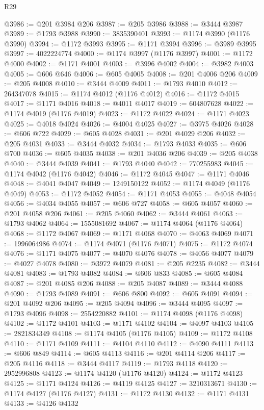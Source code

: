 \begin{lexlean}{R29}
\begin{coremodule}
@3986 := @201 @3984 @206
@3987 := @205 @3986
@3988 := @3444 @3987
@3989 := @1793 @3988
@3990 := 3835390401
@3993 := @1174 @3990 (@1176 @3990)
@3994 := @1172 @3993
@3995 := @1171 @3994
@3996 := @3989 @3995
@3997 := 4022224774
@4000 := @1174 @3997 (@1176 @3997)
@4001 := @1172 @4000
@4002 := @1171 @4001
@4003 := @3996 @4002
@4004 := @3982 @4003
@4005 := @606 @646
@4006 := @605 @4005
@4008 := @201 @4006 @206
@4009 := @205 @4008
@4010 := @3444 @4009
@4011 := @1793 @4010
@4012 := 264347078
@4015 := @1174 @4012 (@1176 @4012)
@4016 := @1172 @4015
@4017 := @1171 @4016
@4018 := @4011 @4017
@4019 := 604807628
@4022 := @1174 @4019 (@1176 @4019)
@4023 := @1172 @4022
@4024 := @1171 @4023
@4025 := @4018 @4024
@4026 := @4004 @4025
@4027 := @3975 @4026
@4028 := @606 @722
@4029 := @605 @4028
@4031 := @201 @4029 @206
@4032 := @205 @4031
@4033 := @3444 @4032
@4034 := @1793 @4033
@4035 := @606 @700
@4036 := @605 @4035
@4038 := @201 @4036 @206
@4039 := @205 @4038
@4040 := @3444 @4039
@4041 := @1793 @4040
@4042 := 770255983
@4045 := @1174 @4042 (@1176 @4042)
@4046 := @1172 @4045
@4047 := @1171 @4046
@4048 := @4041 @4047
@4049 := 1249150122
@4052 := @1174 @4049 (@1176 @4049)
@4053 := @1172 @4052
@4054 := @1171 @4053
@4055 := @4048 @4054
@4056 := @4034 @4055
@4057 := @606 @727
@4058 := @605 @4057
@4060 := @201 @4058 @206
@4061 := @205 @4060
@4062 := @3444 @4061
@4063 := @1793 @4062
@4064 := 1555081692
@4067 := @1174 @4064 (@1176 @4064)
@4068 := @1172 @4067
@4069 := @1171 @4068
@4070 := @4063 @4069
@4071 := 1996064986
@4074 := @1174 @4071 (@1176 @4071)
@4075 := @1172 @4074
@4076 := @1171 @4075
@4077 := @4070 @4076
@4078 := @4056 @4077
@4079 := @4027 @4078
@4080 := @3972 @4079
@4081 := @205 @2235
@4082 := @3444 @4081
@4083 := @1793 @4082
@4084 := @606 @833
@4085 := @605 @4084
@4087 := @201 @4085 @206
@4088 := @205 @4087
@4089 := @3444 @4088
@4090 := @1793 @4089
@4091 := @606 @800
@4092 := @605 @4091
@4094 := @201 @4092 @206
@4095 := @205 @4094
@4096 := @3444 @4095
@4097 := @1793 @4096
@4098 := 2554220882
@4101 := @1174 @4098 (@1176 @4098)
@4102 := @1172 @4101
@4103 := @1171 @4102
@4104 := @4097 @4103
@4105 := 2821834349
@4108 := @1174 @4105 (@1176 @4105)
@4109 := @1172 @4108
@4110 := @1171 @4109
@4111 := @4104 @4110
@4112 := @4090 @4111
@4113 := @606 @849
@4114 := @605 @4113
@4116 := @201 @4114 @206
@4117 := @205 @4116
@4118 := @3444 @4117
@4119 := @1793 @4118
@4120 := 2952996808
@4123 := @1174 @4120 (@1176 @4120)
@4124 := @1172 @4123
@4125 := @1171 @4124
@4126 := @4119 @4125
@4127 := 3210313671
@4130 := @1174 @4127 (@1176 @4127)
@4131 := @1172 @4130
@4132 := @1171 @4131
@4133 := @4126 @4132

\end{coremodule}
\end{lexlean}

